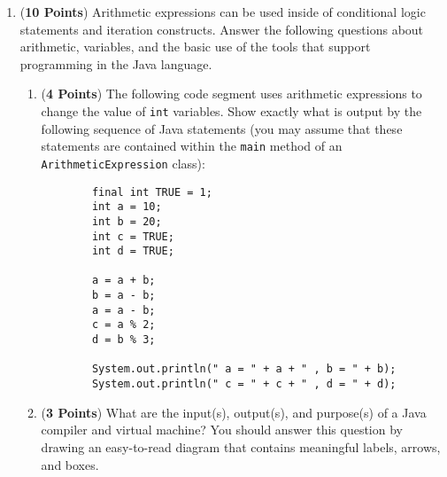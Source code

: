 \documentclass[12pt]{article}
\begin{document}
\begin{enumerate}

\item ({\bf 10 Points}) Arithmetic expressions can be used inside of conditional logic statements and iteration
  constructs.  Answer the following questions about arithmetic, variables, and the basic use of the tools that support
  programming in the Java language.

\begin{enumerate}

\item ({\bf 4 Points}) The following code segment uses arithmetic expressions to change the value of {\tt int}
  variables.  Show exactly what is output by the following sequence of Java statements (you may assume that these
  statements are contained within the {\tt main} method of an {\tt ArithmeticExpression} class):

\begin{minipage}{6in}
  \begin{lstlisting}
        final int TRUE = 1;
        int a = 10;
        int b = 20;
        int c = TRUE;
        int d = TRUE;
        
        a = a + b;
        b = a - b;
        a = a - b;
        c = a % 2;
        d = b % 3;
        
        System.out.println(" a = " + a + " , b = " + b);
        System.out.println(" c = " + c + " , d = " + d);
\end{lstlisting}
\end{minipage}

\item ({\bf 3 Points}) What are the input(s), output(s), and purpose(s) of a Java compiler and virtual machine?  You
  should answer this question by drawing an easy-to-read diagram that contains meaningful labels, arrows, and boxes.




\end{enumerate}
\end{enumerate}
\end{document}
